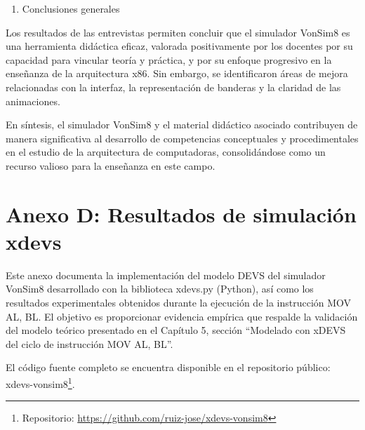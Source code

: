 \documentclass[12pt,oneside]{templates/unerthesis}
\providecommand{\tightlist}{%
  \setlength{\itemsep}{0pt}\setlength{\parskip}{0pt}}
\begin{document}
\begin{enumerate}
\def\labelenumi{\arabic{enumi}.}
\setcounter{enumi}{5}
\tightlist
\item
  Conclusiones generales
\end{enumerate}

Los resultados de las entrevistas permiten concluir que el simulador VonSim8 es una herramienta didáctica eficaz, valorada positivamente por los docentes por su capacidad para vincular teoría y práctica, y por su enfoque progresivo en la enseñanza de la arquitectura x86. Sin embargo, se identificaron áreas de mejora relacionadas con la interfaz, la representación de banderas y la claridad de las animaciones.

En síntesis, el simulador VonSim8 y el material didáctico asociado contribuyen de manera significativa al desarrollo de competencias conceptuales y procedimentales en el estudio de la arquitectura de computadoras, consolidándose como un recurso valioso para la enseñanza en este campo.

\hypertarget{anexoD}{%
\section{Anexo D: Resultados de simulación xdevs}\label{anexoD}}

Este anexo documenta la implementación del modelo DEVS del simulador VonSim8 desarrollado con la biblioteca xdevs.py (Python), así como los resultados experimentales obtenidos durante la ejecución de la instrucción MOV AL, BL.
El objetivo es proporcionar evidencia empírica que respalde la validación del modelo teórico presentado en el Capítulo 5, sección ``Modelado con xDEVS del ciclo de instrucción MOV AL, BL''.

El código fuente completo se encuentra disponible en el repositorio público:
xdevs-vonsim8\footnote{Repositorio: \url{https://github.com/ruiz-jose/xdevs-vonsim8}}.
\end{document}
